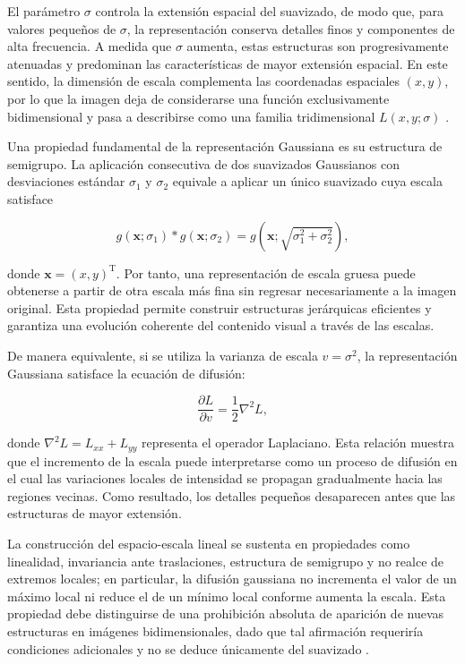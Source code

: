 El parámetro $\sigma$ controla la extensión espacial del suavizado, de modo que, para valores pequeños de $\sigma$, la representación conserva detalles finos y componentes de alta frecuencia. A medida que $\sigma$ aumenta, estas estructuras son progresivamente atenuadas y predominan las características de mayor extensión espacial. En este sentido, la dimensión de escala complementa las coordenadas espaciales $(x,y)$, por lo que la imagen deja de considerarse una función exclusivamente bidimensional y pasa a describirse como una familia tridimensional $L(x,y;\sigma)$ \cite{lindeberg1994scalespace}.

Una propiedad fundamental de la representación Gaussiana es su estructura de semigrupo. La aplicación consecutiva de dos suavizados Gaussianos con desviaciones estándar $\sigma_1$ y $\sigma_2$ equivale a aplicar un único suavizado cuya escala satisface

\begin{equation}
    g(\mathbf{x};\sigma_1)
    *
    g(\mathbf{x};\sigma_2)
    =
    g
    \left(
        \mathbf{x};
        \sqrt{\sigma_1^2+\sigma_2^2}
    \right),
    \label{eq:semigrupo_gaussiano}
\end{equation}

donde $\mathbf{x}=(x,y)^{\mathrm{T}}$. Por tanto, una representación de escala gruesa puede obtenerse a partir de otra escala más fina sin regresar necesariamente a la imagen original. Esta propiedad permite construir estructuras jerárquicas eficientes y garantiza una evolución coherente del contenido visual a través de las escalas.

De manera equivalente, si se utiliza la varianza de escala $v=\sigma^2$, la representación Gaussiana satisface la ecuación de difusión:

\begin{equation}
    \frac{\partial L}{\partial v}
    =
    \frac{1}{2}
    \nabla^2 L,
    \label{eq:ecuacion_difusion_espacio_escala}
\end{equation}

donde $\nabla^2 L=L_{xx}+L_{yy}$ representa el operador Laplaciano. Esta relación muestra que el incremento de la escala puede interpretarse como un proceso de difusión en el cual las variaciones locales de intensidad se propagan gradualmente hacia las regiones vecinas. Como resultado, los detalles pequeños desaparecen antes que las estructuras de mayor extensión.

La construcción del espacio-escala lineal se sustenta en propiedades como linealidad, invariancia ante traslaciones, estructura de semigrupo y no realce de extremos locales; en particular, la difusión gaussiana no incrementa el valor de un máximo local ni reduce el de un mínimo local conforme aumenta la escala. Esta propiedad debe distinguirse de una prohibición absoluta de aparición de nuevas estructuras en imágenes bidimensionales, dado que tal afirmación requeriría condiciones adicionales y no se deduce únicamente del suavizado \cite{lindeberg1994scalespace}.

